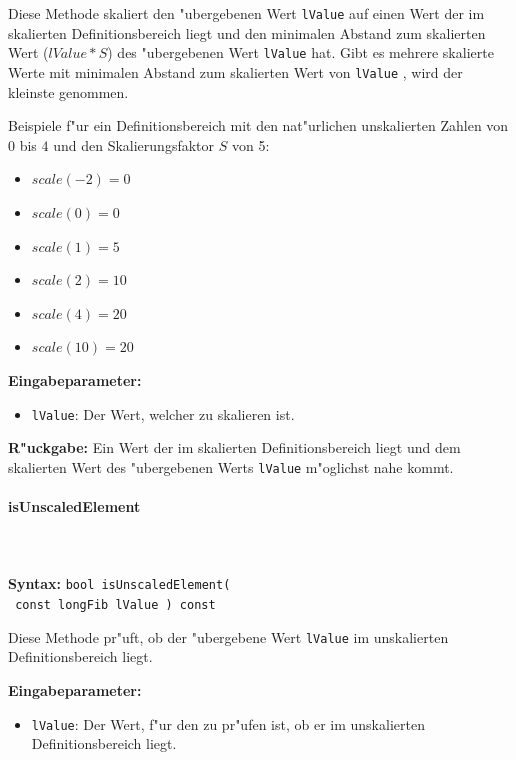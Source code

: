 \bigskip\noindent
Diese Methode skaliert den "ubergebenen Wert \verb|lValue| auf einen Wert der im skalierten Definitionsbereich liegt und den minimalen Abstand zum skalierten Wert ($lValue * S$) des "ubergebenen Wert \verb|lValue| hat. Gibt es mehrere skalierte Werte mit minimalen Abstand zum skalierten Wert von \verb|lValue| , wird der kleinste genommen.

\bigskip\noindent
Beispiele f"ur ein Definitionsbereich mit den nat"urlichen unskalierten Zahlen von $0$ bis $4$ und den Skalierungsfaktor $S$ von 5:
\begin{itemize}
 \item $scale( -2 ) = 0$
 \item $scale( 0 ) = 0$
 \item $scale( 1 ) = 5$
 \item $scale( 2 ) = 10$
 \item $scale( 4 ) = 20$
 \item $scale( 10 ) = 20$
\end{itemize}


\bigskip\noindent
\textbf{Eingabeparameter:}
\begin{itemize}
 \item \verb|lValue|: Der Wert, welcher zu skalieren ist.
\end{itemize}

\bigskip\noindent
\textbf{R"uckgabe:} Ein Wert der im skalierten Definitionsbereich liegt und dem skalierten Wert des "ubergebenen Werts \verb|lValue| m"oglichst nahe kommt.


\paragraph{isUnscaledElement}

\ \\\\\noindent
\textbf{Syntax:} \verb|bool isUnscaledElement(| \\\verb| const longFib lValue ) const|

\bigskip\noindent
Diese Methode pr"uft, ob der "ubergebene Wert \verb|lValue| im unskalierten Definitionsbereich liegt.

\bigskip\noindent
\textbf{Eingabeparameter:}
\begin{itemize}
 \item \verb|lValue|: Der Wert, f"ur den zu pr"ufen ist, ob er im unskalierten Definitionsbereich liegt.
\end{itemize}

